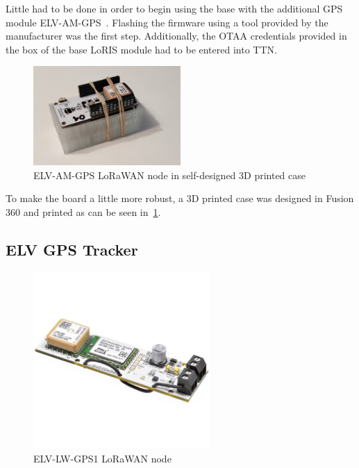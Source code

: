Little had to be done in order to begin using the base with the additional \ac{GPS} module ELV-AM-GPS~\cite{elv_elektronik_ag_elv-track_2022}.
Flashing the firmware using a tool provided by the manufacturer was the first step.
Additionally, the \ac{OTAA} credentials provided in the box of the base LoRIS module had to be entered into \ac{TTN}.

\begin{figure}[h]
    \centering
    \includegraphics[width=0.5\textwidth]{pictures/hardware/gps-nodes/loris_with_case.jpg}
    \caption{ELV-AM-GPS \ac{LoRaWAN} node in self-designed 3D printed case~\label{pic:loris-node-with-case}}
\end{figure}

To make the board a little more robust, a 3D printed case was designed in Fusion 360 and printed as can be seen in~\cref{pic:loris-node-with-case}.

\subsection{ELV \ac{GPS} Tracker}

\begin{figure}[h]
    \centering
    \includegraphics[width=0.6\textwidth]{pictures/hardware/gps-nodes/ELV-LW-GPS1.jpg}
    \caption{ELV-LW-GPS1 \ac{LoRaWAN} node~\protect\cite{elv_elektronik_ag_elv_2023}}
\end{figure}

